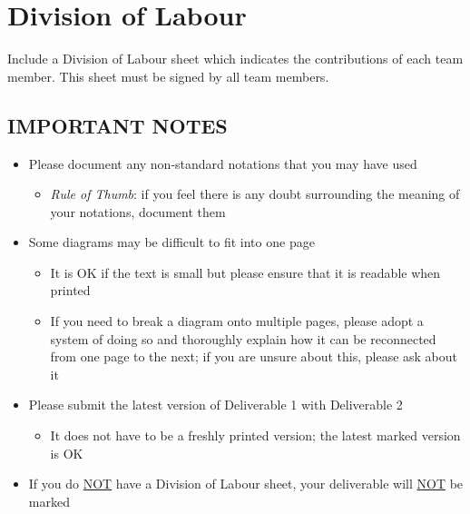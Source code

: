\documentclass[]{article}
\begin{document}
\appendix
\section{Division of Labour}
\label{sec:division_of_labour}
Include a Division of Labour sheet which indicates the contributions of each team member. This sheet must be signed by all team members.
\begin{commentgit a}
\newpage
\section*{IMPORTANT NOTES}
\begin{itemize}
	\item Please document any non-standard notations that you may have used
	\begin{itemize}
		\item \emph{Rule of Thumb}: if you feel there is any doubt surrounding the meaning of your notations, document them
	\end{itemize}
	\item Some diagrams may be difficult to fit into one page
	\begin{itemize}
		\item It is OK if the text is small but please ensure that it is readable when printed
		\item If you need to break a diagram onto multiple pages, please adopt a system of doing so and thoroughly explain how it can be reconnected from one page to the next; if you are unsure about this, please ask about it
	\end{itemize}
	\item Please submit the latest version of Deliverable 1 with Deliverable 2
	\begin{itemize}
		\item It does not have to be a freshly printed version; the latest marked version is OK
	\end{itemize}
	\item If you do \underline{NOT} have a Division of Labour sheet, your deliverable will \underline{NOT} be marked
\end{itemize}
\end{commentgit a}
\end{document}
